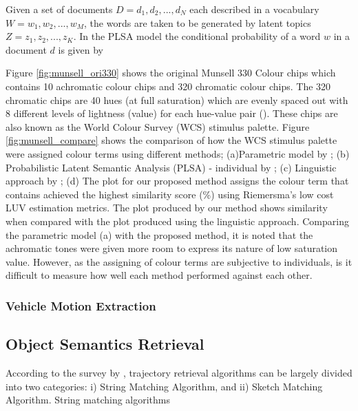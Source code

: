 Given a set of documents $D = {d_1, d_2, ... , d_N}$ each described in a vocabulary $W = {w_1, w_2, ... , w_M}$, the words are taken to be generated by latent topics $Z = {z_1, z_2, ... , z_K}$. In the PLSA model the conditional probability of a word $w$ in a document $d$ is given by




Figure \ref{fig:munsell_ori330} shows the original Munsell 330 Colour chips which contains 10 achromatic colour chips and 320 chromatic colour chips. 
The 320 chromatic chips are 40 hues (at full saturation) which are evenly spaced out with 8 different levels of lightness (value) for each hue-value pair (\cite{kay2009world}).
These chips are also known as the World Colour Survey (WCS) stimulus palette.  
Figure \ref{fig:munsell_compare} shows the comparison of how the WCS stimulus palette were assigned colour terms using different methods; (a)Parametric model by ; (b)  Probabilistic Latent Semantic Analysis (PLSA) - individual by ; (c) Linguistic approach by ; (d) The plot for our proposed method assigns the colour term that contains achieved the highest similarity score (\%) using Riemersma's low cost LUV estimation metrics.
The plot produced by our method shows similarity when compared with the plot produced using the linguistic approach. Comparing the parametric model (a) with the proposed method, it is noted that the achromatic tones were given more room to express its nature of low saturation value. However, as the assigning of colour terms are subjective to individuals, is it difficult to measure how well each method performed against each other. 


\subsubsection{Vehicle Motion Extraction}


\subsection{Object Semantics Retrieval}

According to the survey by \cite{chandran2017review}, trajectory retrieval algorithms can be largely divided into two categories: i) String  Matching Algorithm, and ii) Sketch Matching Algorithm. String matching algorithms   



